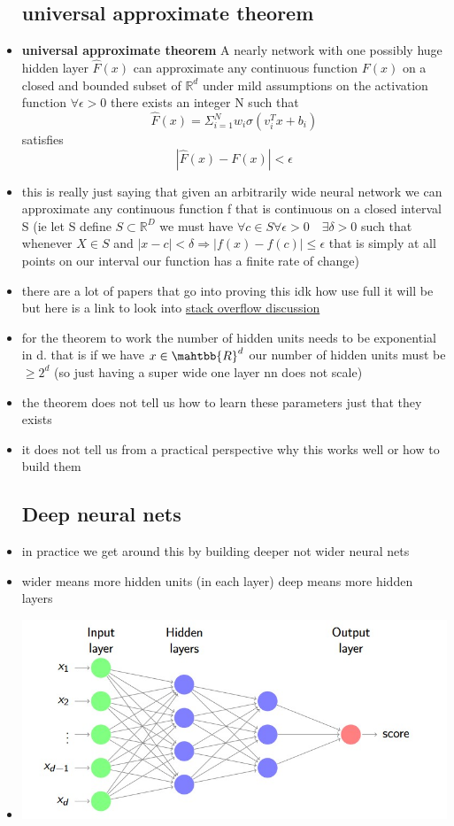\documentclass{article}
\begin{document}
\begin{itemize}
\subsection{universal approximate theorem}
\item \textbf{universal approximate theorem} A nearly network with one possibly huge hidden layer $\hat{F}(x)$ can approximate any continuous function $F(x)$ on a closed and bounded subset of $\mathbb{R}^d$ under mild assumptions on the activation function $\forall \epsilon>0$ there exists an integer N such that $$\hat{F}(x)=\Sigma_{i=1}^{N}w_i\sigma(v_i^Tx+b_i)$$ satisfies $$|\hat{F}(x)-F(x)|<\epsilon$$

\item this is really just saying that given an arbitrarily wide neural network we can approximate any continuous function f that is continuous on a closed interval S (ie let S define $S\subset \mathbb{R}^D$ we must have $\forall c\in S  \forall \epsilon>0\quad \exists \delta>0$ such that whenever $X\in S$ and $|x-c|<\delta \Rightarrow |f(x)-f(c)|\leq \epsilon$ that is simply at all points on our interval our function has a finite rate of change) 
\item there are a lot of papers that go into proving this idk how use full it will be but here is a link to look into \href{https://ai.stackexchange.com/questions/13317/where-can-i-find-the-proof-of-the-universal-approximation-theorem}{stack overflow discussion}
\item for the theorem to work the number of hidden units needs to be exponential in d. that is if we have $x\in \mahtbb{R}^d$ our number of hidden units must be $\geq 2^d$ (so just having a super wide one layer nn does not scale)
\item the theorem does not tell us how to learn these parameters just that they exists 
\item it does not tell us from a practical perspective why this works well or how to build them 
\subsection{Deep neural nets}
\item in practice we get around this by building deeper not wider neural nets 
\item wider means more hidden units (in each layer)
\itme deep means more hidden layers
\item \includegraphics[widht=10cm]{lecture_notes/lecture_11/immages/l11_10.jpg}

\end{itemize}
\end{document}
